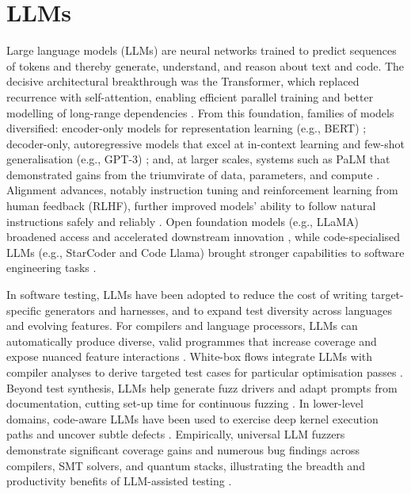 \section{LLMs}

Large language models (LLMs) are neural networks trained to predict sequences of tokens and thereby generate, understand, and reason about text and code. The decisive architectural breakthrough was the Transformer, which replaced recurrence with self-attention, enabling efficient parallel training and better modelling of long-range dependencies \cite{vaswani_2017_attention}. From this foundation, families of models diversified: encoder-only models for representation learning (e.g., BERT) \cite{devlin_2018_bert}; decoder-only, autoregressive models that excel at in-context learning and few-shot generalisation (e.g., GPT-3) \cite{brown_2020_language}; and, at larger scales, systems such as PaLM that demonstrated gains from the triumvirate of data, parameters, and compute \cite{chowdhery_2022_palm}. Alignment advances, notably instruction tuning and reinforcement learning from human feedback (RLHF), further improved models' ability to follow natural instructions safely and reliably \cite{ouyang_2022_training}. Open foundation models (e.g., LLaMA) broadened access and accelerated downstream innovation \cite{touvron_2023_llama}, while code-specialised LLMs (e.g., StarCoder and Code Llama) brought stronger capabilities to software engineering tasks \cite{li_2023_starcoder,rozire_2024_code}.

In software testing, LLMs have been adopted to reduce the cost of writing target-specific generators and harnesses, and to expand test diversity across languages and evolving features. For compilers and language processors, LLMs can automatically produce diverse, valid programmes that increase coverage and expose nuanced feature interactions \cite{xia_2023_universal,chen_2020_a}. White-box flows integrate LLMs with compiler analyses to derive targeted test cases for particular optimisation passes \cite{yang_2023_whitebox}. Beyond test synthesis, LLMs help generate fuzz drivers and adapt prompts from documentation, cutting set-up time for continuous fuzzing \cite{lyu_2024_prompt,jeong_2023_utopia}. In lower-level domains, code-aware LLMs have been used to exercise deep kernel execution paths and uncover subtle defects \cite{yang_2025_kernelgpt}. Empirically, universal LLM fuzzers demonstrate significant coverage gains and numerous bug findings across compilers, SMT solvers, and quantum stacks, illustrating the breadth and productivity benefits of LLM-assisted testing \cite{xia_2023_universal,lin_2025_lmfuzz}.

